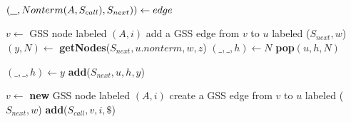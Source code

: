 \begin{algorithmic}    
    \State $(\underline{\hspace{0.25cm}}, Nonterm(A, S_{call}), S_{next})) \gets edge$
    
        \State $v \gets$ GSS node labeled $(A, i)$
            \State add a GSS edge from $v$ to $u$ labeled ($S_{next},w$)
                \State $(y,N) \gets$ \textbf{getNodes}($S_{next}, u.nonterm, w, z$)
                    \State $(\_, \_, h) \gets N$
                    \State \textbf{pop}$(u,h,N)$ 
                \EndIf
                
                \State $(\_, \_, h) \gets y$
                \State \textbf{add}($S_{next} , u, h, y$)
                
            \EndFor
        \EndIf
    
    \Else
        \State $v \gets$ \textbf{new} GSS node labeled $(A, i)$
        \State create a GSS edge from $v$ to $u$ labeled ($S_{next}, w$)
        \State \textbf{add}($S_{call}, v, i, \$ $)
    \EndIf
\EndFunction
\end{algorithmic}  